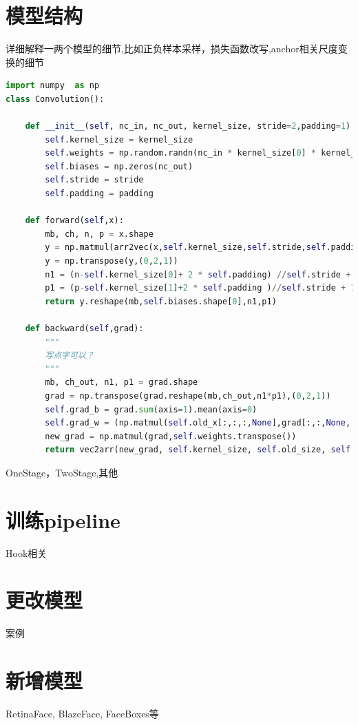 \documentclass[UTF8]{ctexart}
\begin{document}
\section{模型结构}
详细解释一两个模型的细节,比如正负样本采样，损失函数改写,anchor相关尺度变换的细节
\lstset{style=mystyle}
\begin{lstlisting}[language=Python]
import numpy  as np
class Convolution():

	def __init__(self, nc_in, nc_out, kernel_size, stride=2,padding=1):
		self.kernel_size = kernel_size
		self.weights = np.random.randn(nc_in * kernel_size[0] * kernel_size[1] ,nc_out) * np.sqrt(2/nc_in)
		self.biases = np.zeros(nc_out)
		self.stride = stride
		self.padding = padding
	
	def forward(self,x):
		mb, ch, n, p = x.shape
		y = np.matmul(arr2vec(x,self.kernel_size,self.stride,self.padding), self.weights) + self.biases
		y = np.transpose(y,(0,2,1))
		n1 = (n-self.kernel_size[0]+ 2 * self.padding) //self.stride + 1
		p1 = (p-self.kernel_size[1]+2 * self.padding )//self.stride + 1
		return y.reshape(mb,self.biases.shape[0],n1,p1)
	
    def backward(self,grad):
        """
        写点字可以？
        """
		mb, ch_out, n1, p1 = grad.shape
		grad = np.transpose(grad.reshape(mb,ch_out,n1*p1),(0,2,1))
		self.grad_b = grad.sum(axis=1).mean(axis=0)
		self.grad_w = (np.matmul(self.old_x[:,:,:,None],grad[:,:,None,:])).sum(axis=1).mean(axis=0)
		new_grad = np.matmul(grad,self.weights.transpose())
		return vec2arr(new_grad, self.kernel_size, self.old_size, self.stride, self.padding)

\end{lstlisting}
OneStage，TwoStage,其他
\section{训练pipeline}
Hook相关
\section{更改模型}
案例
\section{新增模型}
RetinaFace, BlazeFace, FaceBoxes等
\end{document}
